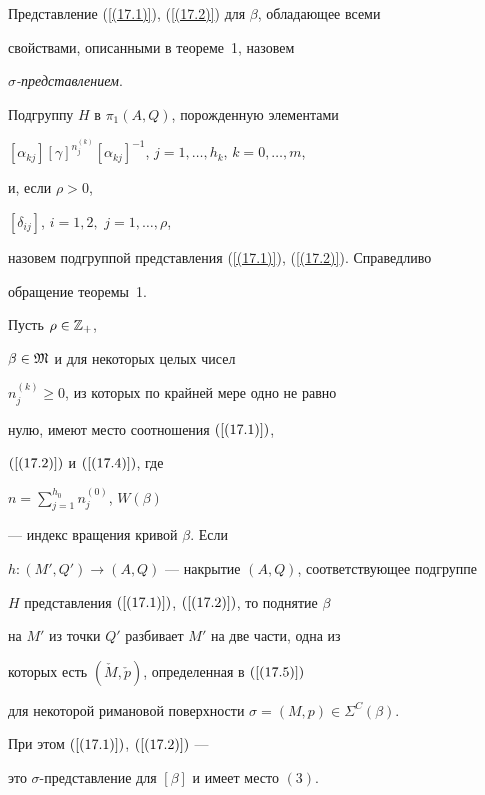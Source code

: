Представление (\ref{(17.1)}), (\ref{(17.2)}) для $\beta$, обладающее всеми


свойствами, описанными в теореме~1, назовем


{\it $\sigma$-представлением}.


Подгруппу $H$ в $\pi_1(A,Q)$, порожденную элементами


$[\alpha_{kj}][\gamma]^{n^{(k)}_j}


[\alpha_{kj}]^{-1}$, $j=1,\dotsc,h_k$, $k=0,\dotsc,m$,


и, если $\rho>0$,


$[\delta_{ij}]$, $i=1,2,$ $j=1,\dotsc,\rho$,


назовем подгруппой представления (\ref{(17.1)}), (\ref{(17.2)}). Справедливо


обращение теоремы~1.





\begin{thm}


Пусть $\rho \in\Bbb Z_+$,


$\beta\in\frak M$ и для некоторых целых чисел


$n^{(k)}_j\ge0$, из которых по крайней мере одно не равно


нулю, имеют место соотношения $(\ref{(17.1)})$,


$(\ref{(17.2)})$ и $(\ref{(17.4)})$, где


$n=\sum\limits^{h_0}_{j=1}n^{(0)}_{j}$, $W(\beta)$


--- индекс вращения кривой $\beta $. Если


$h:(M',Q')\to(A,Q)$ --- накрытие $(A,Q)$, соответствующее подгруппе


$H$ представления $(\ref{(17.1)})$, $(\ref{(17.2)})$, то поднятие $\beta$


на $M'$ из точки $Q'$ разбивает $M'$ на две части, одна из


которых есть $(\check M,\check p)$, определенная в $(\ref{(17.5)})$


для некоторой римановой поверхности $\sigma=(M,p)\in\Sigma^C(\beta)$.


При этом $(\ref{(17.1)})$, $(\ref{(17.2)})$ ---


это $\sigma$-представление для $[\beta]$ и имеет место $(3)$.


\end{thm}





